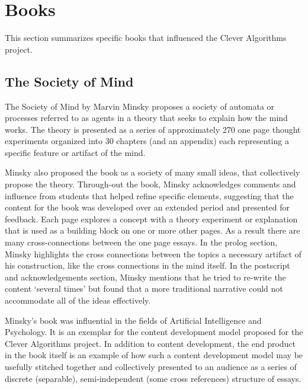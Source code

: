 \documentclass[a4paper, 11pt]{article}
\begin{document}
\section{Books}
\label{sec:books}
This section summarizes specific books that influenced the Clever Algorithms project.

% 
% 
\subsection{The Society of Mind}
The Society of Mind by Marvin Minsky \cite{Minsky1988} proposes a society of automata or processes referred to as agents in a theory that seeks to explain how the mind works. The theory is presented as a series of approximately 270 one page thought experiments organized into 30 chapters (and an appendix) each representing a specific feature or artifact of the mind. 

Minsky also proposed the book as a society of many small ideas, that collectively propose the theory. Through-out the book, Minsky acknowledges comments and influence from students that helped refine specific elements, suggesting that the content for the book was developed over an extended period and presented for feedback. Each page explores a concept with a theory experiment or explanation that is used as a building block on one or more other pages. As a result there are many cross-connections between the one page essays. In the prolog section, Minsky highlights the cross connections between the topics a necessary artifact of his construction, like the cross connections in the mind itself. In the postscript and acknowledgements section, Minsky mentions that he tried to re-write the content `several times' but found that a more traditional narrative could not accommodate all of the ideas effectively. 

Minsky's book was influential in the fields of Artificial Intelligence and Psychology. It is an exemplar for the content development model proposed for the Clever Algorithms project. In addition to content development, the end product in the book itself is an example of how such a content development model may be usefully stitched together and collectively presented to an audience as a series of discrete (separable), semi-independent (some cross references) structure of essays. 

% 
% 
\end{document}
